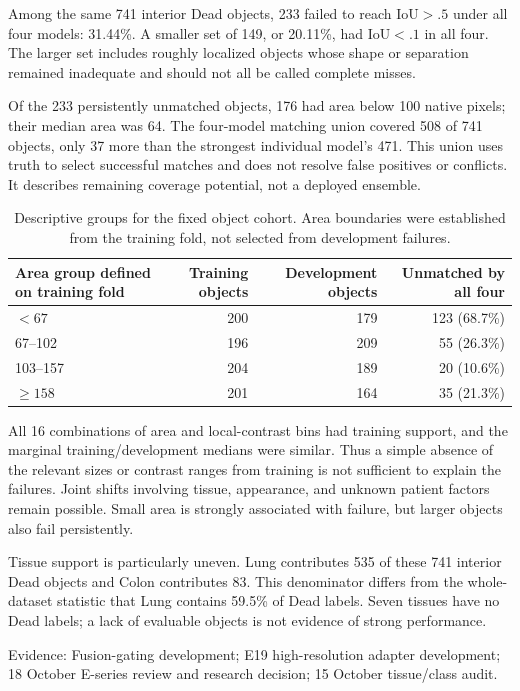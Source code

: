 \documentclass[11pt,a4paper]{article}
\newcommand{\src}[1]{\par{\footnotesize\color{gray}Evidence: #1}\par}
\begin{document}
Among the same 741 interior Dead objects, 233 failed to reach IoU$>.5$ under all four models: 31.44\%. A smaller set of 149, or 20.11\%, had IoU$<.1$ in all four. The larger set includes roughly localized objects whose shape or separation remained inadequate and should not all be called complete misses.

Of the 233 persistently unmatched objects, 176 had area below 100 native pixels; their median area was 64. The four-model matching union covered 508 of 741 objects, only 37 more than the strongest individual model's 471. This union uses truth to select successful matches and does not resolve false positives or conflicts. It describes remaining coverage potential, not a deployed ensemble.

\begin{table}[H]\centering\small
\begin{tabular}{lrrr}\toprule
Area group defined on training fold & Training objects & Development objects & Unmatched by all four\\\midrule
$<67$ & 200 & 179 & 123 (68.7\%)\\
67--102 & 196 & 209 & 55 (26.3\%)\\
103--157 & 204 & 189 & 20 (10.6\%)\\
$\ge158$ & 201 & 164 & 35 (21.3\%)\\\bottomrule
\end{tabular}
\caption{Descriptive groups for the fixed object cohort. Area boundaries were established from the training fold, not selected from development failures.}
\end{table}

All 16 combinations of area and local-contrast bins had training support, and the marginal training/development medians were similar. Thus a simple absence of the relevant sizes or contrast ranges from training is not sufficient to explain the failures. Joint shifts involving tissue, appearance, and unknown patient factors remain possible. Small area is strongly associated with failure, but larger objects also fail persistently.

Tissue support is particularly uneven. Lung contributes 535 of these 741 interior Dead objects and Colon contributes 83. This denominator differs from the whole-dataset statistic that Lung contains 59.5\% of Dead labels. Seven tissues have no Dead labels; a lack of evaluable objects is not evidence of strong performance.

\src{Fusion-gating development; E19 high-resolution adapter development; 18 October E-series review and research decision; 15 October tissue/class audit.}
\end{document}
